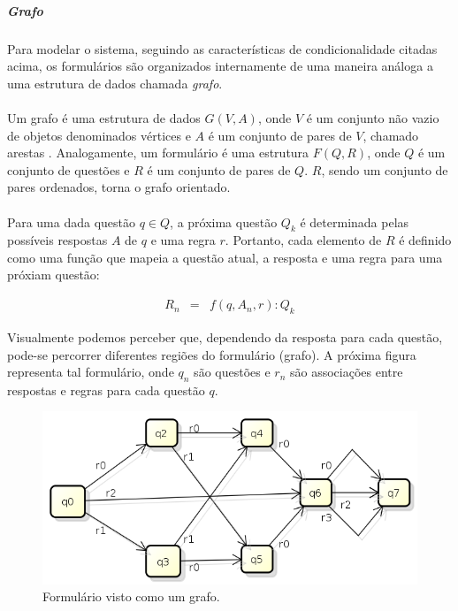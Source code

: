 \documentclass[11pt]{article}
\begin{document}
        \subparagraph{Grafo}
        
        \paragraph{}
        
        Para modelar o sistema, seguindo as características de condicionalidade
        citadas acima, os formulários são organizados internamente de uma maneira
        análoga a uma estrutura de dados chamada {\em grafo}. 
        
        \paragraph{}
        
        Um grafo é uma estrutura de dados $G(V,A)$, onde $V$ é um 
        conjunto não vazio de objetos 
        denominados vértices e $A$ é um conjunto de pares de $V$, 
        chamado arestas \cite{graphTenenbaum,graphMarcos}. Analogamente, 
        um formulário é uma estrutura $F(Q, R)$, onde $Q$ é um conjunto
        de questões e $R$ é um conjunto de pares de $Q$. $R$, sendo um conjunto de 
        pares ordenados, torna o grafo orientado.
        
        \paragraph{}
        
        Para uma dada questão $q \in Q$, a próxima questão $Q_k$ é determinada 
        pelas possíveis respostas $A$ de $q$ e uma regra $r$. Portanto, cada elemento
        de $R$ é definido como uma função que mapeia a questão atual, a 
        resposta e uma regra para uma próxiam questão: 
        
        \begin{eqnarray}
          R_n &=& f(q, A_n, r) : Q_k
        \end{eqnarray}
        
        Visualmente podemos perceber que, dependendo da resposta para 
        cada questão, pode-se percorrer diferentes regiões do formulário
        (grafo). A próxima figura representa tal formulário, onde $q_n$ são questões e $r_n$ são associações entre respostas 
        e regras para cada questão $q$.
        
        \begin{figure}[h!]
          \centering
          \includegraphics[width=.9\textwidth]{graph.png}
          \caption{Formulário visto como um grafo.}
        \end{figure}
          
\end{document}
